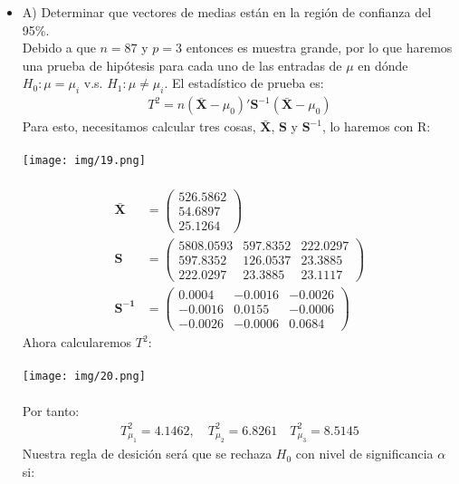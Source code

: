 \begin{sol}
\begin{itemize}
\item A) Determinar que vectores de medias están en la región de confianza del 95\%. \\
Debido a que $n=87$ y $p=3$ entonces es muestra grande, por lo que haremos una prueba de hipótesis para cada uno de las entradas de $\mu$ en dónde $H_0 : \mu = \mu_i$ v.s. $H_1:\mu \neq \mu_i$. El estadístico de prueba es:
\begin{align*}
T^2=n(\bar{\mathbf{X}} - \mu_0)'\mathbf{S}^{-1}(\mathbf{\bar{X}}-\mu_0)
\end{align*}
Para esto, necesitamos calcular tres cosas, $\mathbf{\bar{X}}$, $\mathbf{S}$ y $\mathbf{S}^{-1}$, lo haremos con R:\\\\
\texttt{[image: img/19.png]}\\\\
\begin{align*}
    \mathbf{\bar{X}}&= \begin{pmatrix} 
        526.5862 \\ 
        54.6897 \\ 
        25.1264 
    \end{pmatrix} \\
    \mathbf{S} &= \begin{pmatrix}
        5808.0593 & 597.8352 & 222.0297 \\ 
        597.8352 & 126.0537 & 23.3885 \\ 
        222.0297 & 23.3885 & 23.1117 
    \end{pmatrix} \\
    \mathbf{S^{-1}} &= \begin{pmatrix}
        0.0004 & -0.0016 & -0.0026 \\ 
        -0.0016 & 0.0155 & -0.0006 \\ 
        -0.0026 & -0.0006 & 0.0684
    \end{pmatrix}
\end{align*}
Ahora calcularemos $T^2$:\\\\
\texttt{[image: img/20.png]}\\\\
Por tanto:
\begin{align*}
T_{\mu_1}^2=4.1462,\quad T_{\mu_2}^2=6.8261 \quad T_{\mu_3}^2=8.5145
\end{align*}
Nuestra regla de desición será que se rechaza $H_0$ con nivel de significancia $\alpha$ si:

\end{itemize}
\end{sol}

